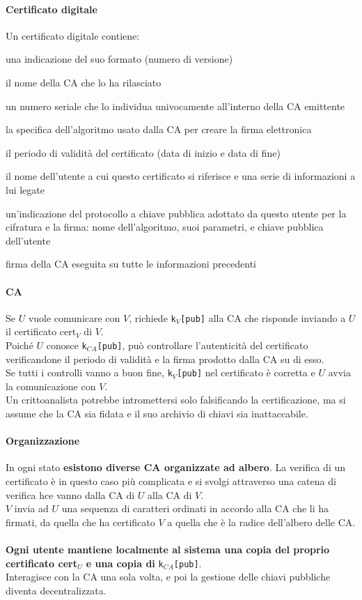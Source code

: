 \documentclass[10pt]{book}
\begin{document}
\paragraph{Certificato digitale} Un certificato digitale contiene:
\begin{list}{}{}
\item una indicazione del suo formato (numero di versione)
\item il nome della CA che lo ha rilasciato
\item un numero seriale che lo individua univocamente all'interno della CA emittente
\item la specifica dell'algoritmo usato dalla CA per creare la firma elettronica
\item il periodo di validità del certificato (data di inizio e data di fine)
\item il nome dell'utente a cui questo certificato si riferisce e una serie di informazioni a lui legate
\item un'indicazione del protocollo a chiave pubblica adottato da questo utente
per la cifratura e la firma: nome dell'algoritmo, suoi parametri, e chiave pubblica dell'utente
\item firma della CA eseguita su tutte le informazioni precedenti
\end{list}
\pagebreak
\paragraph{CA} Se $U$ vuole comunicare con $V$, richiede \texttt{k$_V$[pub]} alla CA che risponde inviando a $U$ il certificato cert$_V$ di $V$.\\
Poiché $U$ conosce \texttt{k$_{CA}$[pub]}, può controllare l'autenticità del certificato verificandone il periodo di validità e la firma prodotto dalla CA su di esso.\\
Se tutti i controlli vanno a buon fine, \texttt{k$_V$[pub]} nel certificato è corretta e $U$ avvia la comunicazione con $V$.\\
Un crittoanalista potrebbe intromettersi solo falsificando la certificazione, ma si assume che la CA sia fidata e il suo archivio di chiavi sia inattaccabile.
\paragraph{Organizzazione} In ogni stato \textbf{esistono diverse CA organizzate ad albero}. La verifica di un certificato è in questo caso più complicata e si svolgi attraverso una catena di verifica hce vanno dalla CA di $U$ alla CA di $V$.\\
$V$ invia ad $U$ una sequenza di caratteri ordinati in accordo alla CA che li ha firmati, da quella che ha certificato $V$ a quella che è la radice dell'albero delle CA.\\\\
\textbf{Ogni utente mantiene localmente al sistema una copia del proprio certificato cert$_U$ e una copia di} \texttt{k$_{CA}$[pub]}.\\
Interagisce con la CA una sola volta, e poi la gestione delle chiavi pubbliche diventa decentralizzata.
\end{document}
